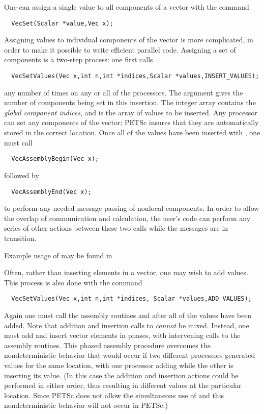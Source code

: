 One can assign a single value to all components of a vector with the 
command 
\begin{verbatim}
  VecSet(Scalar *value,Vec x);
\end{verbatim}
Assigning values to individual components of the vector is more 
complicated, in order to make it possible to write efficient parallel 
code.  Assigning a set of components is a two-step process: one 
first calls   
\begin{verbatim}
  VecSetValues(Vec x,int n,int *indices,Scalar *values,INSERT_VALUES);
\end{verbatim}
any number of times on any or all of the processors. The argument
 gives the number of components being set in this 
insertion. The integer array  contains the {\em global component
indices}, and  is the array of values to be inserted.
Any processor can set any components of the vector; PETSc insures that 
they are automatically stored in the correct location.
Once all of the values have been inserted with ,
one must call 
\begin{verbatim}
  VecAssemblyBegin(Vec x);
\end{verbatim}
followed by  
\begin{verbatim}
  VecAssemblyEnd(Vec x);
\end{verbatim}
to perform any needed message passing of nonlocal components.
In order to allow the overlap of communication and calculation,
the user's code can perform any series of other actions between these 
two calls while the messages are in transition. 

Example usage of  may be found in 

Often, rather than inserting elements in a vector, one may wish to 
add values. This process 
is also done with the command 
\begin{verbatim}
  VecSetValues(Vec x,int n,int *indices, Scalar *values,ADD_VALUES);
\end{verbatim}
Again  one must call the assembly routines  and  after all of the values
have been added.  Note that addition and insertion calls to  {\em cannot} be mixed.  Instead, one must add and insert
vector elements in phases, with intervening calls to the assembly
routines. This phased assembly procedure overcomes the nondeterministic
behavior that
would occur if two different processors generated values
for the same location, with one processor adding while the other is inserting
its value.  (In this case the addition and insertion actions could be performed 
in either order,
thus resulting in different values at the particular location. Since
PETSc does not allow the simultaneous use of  and
 this nondeterministic behavior will not occur in PETSc.)

